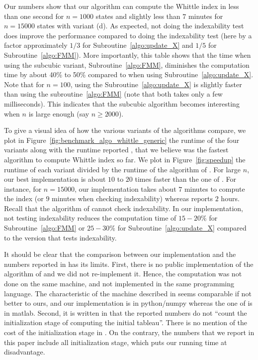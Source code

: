 \documentclass[acmsmall,screen,anonymous]{acmart}
\begin{document}
Our numbers show that our algorithm can compute the Whittle index in less than one second for $n=1000$ states and slightly less than $7$ minutes for $n=15000$ states with variant (d). As expected, not doing the indexability test does improve the performance compared to doing the indexability test (here by a factor approximately $1/3$ for Subroutine~\ref{algo:update_X} and $1/5$ for Subroutine~\ref{algo:FMM}). More importantly, this table shows that the time when using the subcubic variant, Subroutine~\ref{algo:FMM}, diminishes the computation time by about 40\% to 50\% compared to when using Subroutine~\ref{algo:update_X}. Note that for $n=100$, using the Subroutine~\ref{algo:update_X} is slightly faster than using the subroutine~\ref{algo:FMM} (note that both takes only a few milliseconds). This indicates that the subcubic algorithm becomes interesting when $n$ is large enough (say $n\ge2000$).

To give a visual idea of how the various variants of the algorithms compare, we plot in Figure~\ref{fig:benchmark_algo_whittle_generic} the runtime of the four variants along with the runtime reported \cite{nino2020fast}, that we believe was the fastest algorithm to compute Whittle index so far. We plot in Figure~\ref{fig:speedup} the runtime of each variant divided by the runtime of the algorithm of \cite{nino2020fast}. For large $n$, our best implementation is about $10$ to $20$ times faster than the one of \cite{nino2020fast}. For instance, for $n=15000$, our implementation takes about $7$ minutes to compute the index (or $9$ minutes when checking indexability) whereas \cite{nino2020fast} reports $2$ hours. Recall that the algorithm of \cite{nino2020fast} cannot check indexability. In our implementation, not testing indexability reduces the computation time of $15-20\%$ for Subroutine~\ref{algo:FMM} or $25-30\%$ for Subroutine~\ref{algo:update_X} compared to the version that tests indexability.


It should be clear that the comparison between our implementation and the numbers reported in \cite{nino2020fast} has its limits. First, there is no public implementation of the algorithm of \cite{nino2020fast} and we did not re-implement it. Hence, the computation was not done on the same machine, and not implemented in the same programming language. The characteristic of the machine described in \cite{nino2020fast} seems comparable if not better to ours, and our implementation is in python/numpy whereas the one of \cite{nino2020fast} is in matlab.  Second, it is written in \cite{nino2020fast} that the reported numbers do not ``count the initialization stage of computing the initial tableau''. There is no mention of the cost of the initialization stage in \cite{nino2020fast}. On the contrary, the numbers that we report in this paper include all initialization stage, which puts our running time at disadvantage. 
\end{document}
